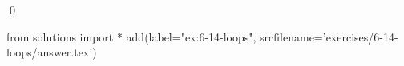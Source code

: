 
\begin{ex}
  \label{ex:6-14-loops}
  
  \qed
\end{ex}
\begin{python0}
from solutions import *
add(label="ex:6-14-loops",
    srcfilename='exercises/6-14-loops/answer.tex')
\end{python0}

